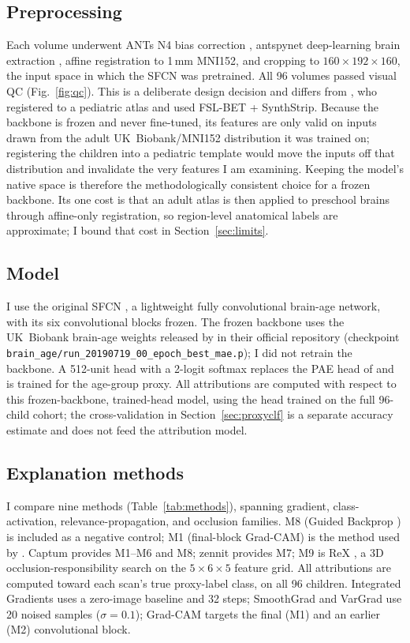 \documentclass[11pt]{article}
\begin{document}
\subsection{Preprocessing}
Each volume underwent ANTs \citep{avants2011} N4 bias correction \citep{tustison2010},
antspynet deep-learning brain extraction \citep{tustison2021},
affine registration to 1\,mm MNI152, and cropping to $160\times192\times160$, the input
space in which the SFCN was pretrained. All 96 volumes passed visual QC
(Fig.~\ref{fig:qc}). This is a deliberate design decision and differs from \citet{das2024},
who registered to a pediatric atlas and used FSL-BET + SynthStrip. Because the backbone is
frozen and never fine-tuned, its features are only valid on inputs drawn from the adult
UK~Biobank/MNI152 distribution it was trained on; registering the children into a pediatric
template would move the inputs off that distribution and invalidate the very features I am
examining. Keeping the model's native space is therefore the methodologically consistent choice
for a frozen backbone. Its one cost is that an adult atlas is then applied to preschool brains
through affine-only registration, so region-level anatomical labels are approximate; I bound
that cost in Section~\ref{sec:limits}.

\subsection{Model}
I use the original SFCN \citep{peng2021}, a lightweight fully convolutional brain-age
network, with its six convolutional blocks frozen. The frozen backbone uses the UK~Biobank
brain-age weights released by \citet{peng2021} in their official repository
\citep{sfcnweights} (checkpoint \texttt{brain\_age/run\_20190719\_00\_epoch\_best\_mae.p}); I
did not retrain the backbone. A 512-unit head with a 2-logit softmax
replaces the PAE head of \citet{das2024} and is trained for the age-group proxy. All attributions are
computed with respect to this frozen-backbone, trained-head model, using the head trained on
the full 96-child cohort; the cross-validation in Section~\ref{sec:proxyclf} is a separate
accuracy estimate and does not feed the attribution model.

\subsection{Explanation methods}
I compare nine methods (Table~\ref{tab:methods}), spanning gradient, class-activation,
relevance-propagation, and occlusion families. M8 (Guided Backprop \citep{springenberg2015})
is included as a negative control; M1 (final-block Grad-CAM) is the method used by
\citet{das2024}. Captum \citep{kokhlikyan2020} provides M1--M6 and M8; zennit
\citep{anders2021} provides M7; M9 is ReX \citep{chockler2024rex}, a 3D
occlusion-responsibility search on the $5\times6\times5$ feature grid. All attributions are
computed toward each scan's true proxy-label class, on all 96 children. Integrated Gradients
uses a zero-image baseline and 32 steps; SmoothGrad and VarGrad use 20 noised samples
($\sigma=0.1$); Grad-CAM targets the final (M1) and an earlier (M2) convolutional block.
\end{document}
